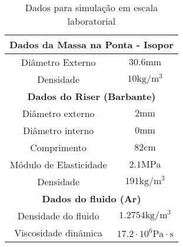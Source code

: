 \begin{table}[!ht]
\centering
\caption{Dados para simulação em escala laboratorial\label{escalaLaboratorial}}
	\begin{tabular}{|c|c|}
	\hline
		\multicolumn{2}{|c|}{\textbf{Dados da Massa na Ponta - Isopor}} \\ \hline
		Diâmetro Externo & $30.6\mathrm{mm}$\\ \hline
		Densidade & $10\mathrm{kg}/\mathrm{m}^3$ \\ \hline
		\multicolumn{2}{|c|}{\textbf{Dados do Riser (Barbante)}}\\ \hline
		Diâmetro externo & $2\mathrm{mm}$\\ \hline
		Diâmetro interno & $0\mathrm{mm}$ \\ \hline
		Comprimento & $82\mathrm{cm}$ \\ \hline
		Módulo de Elasticidade & $2.1 \mathrm{MPa}$\\ \hline
		Densidade &  $191\mathrm{kg}/\mathrm{m}^3$\\ \hline
		\multicolumn{2}{|c|}{\textbf{Dados do fluido (Ar)}}\\ \hline
		Densidade do fluido &  $1.2754\mathrm{kg}/\mathrm{m}^3$\\ \hline
		Viscosidade dinâmica & $17.2\cdot 10^6 \mathrm{Pa}\cdot \mathrm{s}$ \\ \hline
	\end{tabular}
\end{table}
